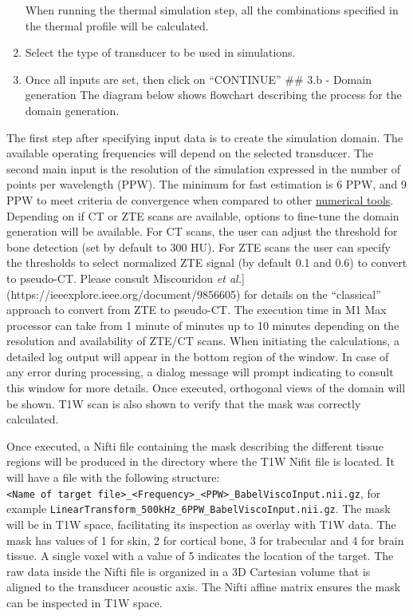 \begin{enumerate}
  When running the thermal simulation step, all the combinations
  specified in the thermal profile will be calculated.
\item
  Select the type of transducer to be used in simulations.
\item
  Once all inputs are set, then click on ``CONTINUE'' \#\# 3.b - Domain
  generation The diagram below shows flowchart describing the process
  for the domain generation.
\end{enumerate}

The first step after specifying input data is to create the simulation
domain. The available operating frequencies will depend on the selected
transducer. The second main input is the resolution of the simulation
expressed in the number of points per wavelength (PPW). The minimum for
fast estimation is 6 PPW, and 9 PPW to meet criteria de convergence when
compared to other
\href{https://asa.scitation.org/doi/10.1121/10.0013426}{numerical
tools}. Depending on if CT or ZTE scans are available, options to
fine-tune the domain generation will be available. For CT scans, the
user can adjust the threshold for bone detection (set by default to 300
HU). For ZTE scans the user can specify the thresholds to select
normalized ZTE signal (by default 0.1 and 0.6) to convert to pseudo-CT.
Please consult Miscouridou \emph{et
al.}{]}(https://ieeexplore.ieee.org/document/9856605) for details on the
``classical'' approach to convert from ZTE to pseudo-CT. The execution
time in M1 Max processor can take from 1 minute of minutes up to 10
minutes depending on the resolution and availability of ZTE/CT scans.
When initiating the calculations, a detailed log output will appear in
the bottom region of the window. In case of any error during processing,
a dialog message will prompt indicating to consult this window for more
details. Once executed, orthogonal views of the domain will be shown.
T1W scan is also shown to verify that the mask was correctly calculated.

Once executed, a Nifti file containing the mask describing the different
tissue regions will be produced in the directory where the T1W Nifit
file is located. It will have a file with the following structure:
\texttt{\textless{}Name\ of\ target\ file\textgreater{}\_\textless{}Frequency\textgreater{}\_\textless{}PPW\textgreater{}\_BabelViscoInput.nii.gz},
for example
\texttt{LinearTransform\_500kHz\_6PPW\_BabelViscoInput.nii.gz}. The mask
will be in T1W space, facilitating its inspection as overlay with T1W
data. The mask has values of 1 for skin, 2 for cortical bone, 3 for
trabecular and 4 for brain tissue. A single voxel with a value of 5
indicates the location of the target. The raw data inside the Nifti file
is organized in a 3D Cartesian volume that is aligned to the transducer
acoustic axis. The Nifti affine matrix ensures the mask can be inspected
in T1W space.

